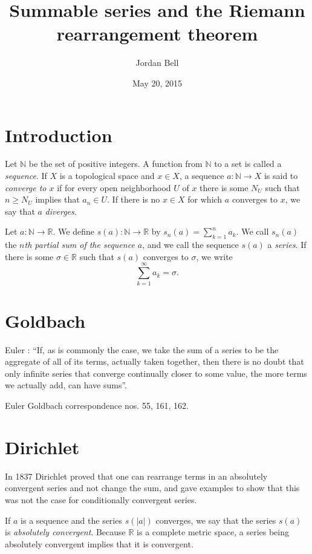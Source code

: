 \documentclass{article}
\begin{document}
\title{Summable series and the Riemann rearrangement theorem}
\author{Jordan Bell}
\date{May 20, 2015}

\maketitle

\section{Introduction}
Let $\mathbb{N}$ be the set of positive integers. A function from $\mathbb{N}$ to a set is called a {\em sequence}. If $X$ is a topological space 
and $x \in X$, a sequence $a:\mathbb{N} \to X$ is said to {\em converge to $x$} if for every open neighborhood $U$ of $x$ there is some
$N_U$ such that $n \geq N_U$ implies that $a_n \in U$. 
If there is no $x \in X$ for which  $a$ converges to $x$, we say that $a$ {\em diverges}.

Let $a:\mathbb{N} \to \mathbb{R}$.
We define $s(a):\mathbb{N} \to \mathbb{R}$ by $s_n(a)=\sum_{k=1}^n a_k$. We call $s_n(a)$  the {\em $n$th partial sum of the sequence $a$}, and we call
the sequence $s(a)$ a {\em series}. 
If there is some $\sigma \in \mathbb{R}$ such that $s(a)$ converges to $\sigma$, we write
\[
\sum_{k=1}^\infty a_k = \sigma.
\]

\section{Goldbach}
Euler \cite[\S 110]{E212}:
``If, as is commonly the case, we take the sum of a series to be the aggregate
of all of its terms, actually taken together, then there is no doubt that only
infinite series that converge continually closer to some value, the more
terms we actually add, can have sums''.


Euler Goldbach correspondence nos. 55, 161, 162.



\section{Dirichlet}
In 1837 Dirichlet proved that one can rearrange terms in an absolutely convergent series and not change the sum,
and gave examples to show that this was not the case for conditionally
convergent series.

If $a$ is a sequence and the series $s(|a|)$ converges, we say that the series $s(a)$ is {\em absolutely convergent}.
Because $\mathbb{R}$ is a complete metric space, a series being absolutely convergent implies that it is convergent.
\end{document}

